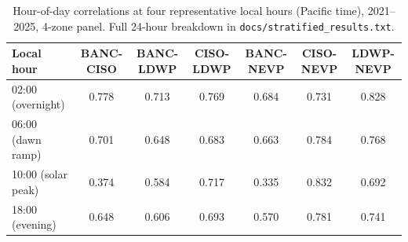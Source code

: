 \begin{table}[ht]
\centering
\small
\caption{Hour-of-day correlations at four representative local hours (Pacific time), 2021--2025, 4-zone panel. Full 24-hour breakdown in \texttt{docs/stratified\_results.txt}.}
\label{tab:hourly}
\setlength{\tabcolsep}{4pt}
\begin{tabular}{lcccccc}
\toprule
Local hour & BANC-CISO & BANC-LDWP & CISO-LDWP & BANC-NEVP & CISO-NEVP & LDWP-NEVP \\
\midrule
02:00 (overnight) & 0.778 & 0.713 & 0.769 & 0.684 & 0.731 & 0.828 \\
06:00 (dawn ramp) & 0.701 & 0.648 & 0.683 & 0.663 & 0.784 & 0.768 \\
10:00 (solar peak) & 0.374 & 0.584 & 0.717 & 0.335 & 0.832 & 0.692 \\
18:00 (evening) & 0.648 & 0.606 & 0.693 & 0.570 & 0.781 & 0.741 \\
\bottomrule
\end{tabular}
\end{table}
